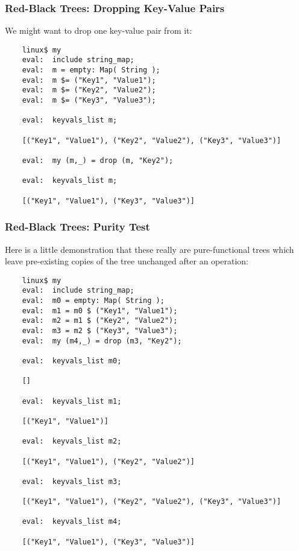 \cutend*

\subsubsection{Red-Black Trees:  Dropping Key-Value Pairs}

We might want to drop one key-value pair from it:

\begin{verbatim}
    linux$ my
    eval:  include string_map;
    eval:  m = empty: Map( String );
    eval:  m $= ("Key1", "Value1");
    eval:  m $= ("Key2", "Value2");
    eval:  m $= ("Key3", "Value3");

    eval:  keyvals_list m;

    [("Key1", "Value1"), ("Key2", "Value2"), ("Key3", "Value3")]

    eval:  my (m,_) = drop (m, "Key2");

    eval:  keyvals_list m;

    [("Key1", "Value1"), ("Key3", "Value3")]
\end{verbatim}

\cutend*

\subsubsection{Red-Black Trees:  Purity Test}

Here is a little demonstration that these really are pure-functional 
trees which leave pre-existing copies of the tree unchanged after 
an operation:

\begin{verbatim}
    linux$ my
    eval:  include string_map;
    eval:  m0 = empty: Map( String );
    eval:  m1 = m0 $ ("Key1", "Value1");
    eval:  m2 = m1 $ ("Key2", "Value2");
    eval:  m3 = m2 $ ("Key3", "Value3");
    eval:  my (m4,_) = drop (m3, "Key2");

    eval:  keyvals_list m0;

    []

    eval:  keyvals_list m1;

    [("Key1", "Value1")]

    eval:  keyvals_list m2;

    [("Key1", "Value1"), ("Key2", "Value2")]

    eval:  keyvals_list m3;

    [("Key1", "Value1"), ("Key2", "Value2"), ("Key3", "Value3")]

    eval:  keyvals_list m4;

    [("Key1", "Value1"), ("Key3", "Value3")]
\end{verbatim}

